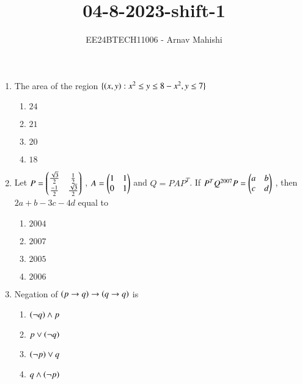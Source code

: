 \documentclass[journal]{IEEEtran}
\begin{document}

\vspace{3cm}

\title{04-8-2023-shift-1}
\author{EE24BTECH11006 - Arnav Mahishi}
{\let\newpage\relax\maketitle}
\begin{enumerate}
\item{
The area of the region $\{\left(x,y\right):x^2\leq y \leq 8-x^2,y \leq 7\}$
\begin{multicols}{4}
\begin{enumerate}
\item$24$
\item$21$
\item$20$
\item$18$
\end{enumerate}
\end{multicols}
}
\item{
Let $P=\begin{pmatrix}\frac{\sqrt{3}}{2}&\frac{1}{2}\\\frac{-1}{2}&\frac{\sqrt{3}}{2}\end{pmatrix}$ , $A=\begin{pmatrix}1&1\\0&1\end{pmatrix}$ and $Q=PAP^T$. If $P^TQ^{2007}P=\begin{pmatrix}a&b\\c&d\end{pmatrix}$ , then $2a+b-3c-4d$ equal to
\begin{multicols}{4}
\begin{enumerate}
\item $2004$
\item $2007$
\item $2005$
\item $2006$
\end{enumerate}
\end{multicols}}
\item{
Negation of $\left(p\rightarrow q\right)\rightarrow\left(q\rightarrow q\right)$ is 
\begin{multicols}{4}
\begin{enumerate}
\item $\left(\neg q\right)\wedge p$
\item $p\vee\left(\neg q\right)$
\item $\left(\neg p\right)\vee q$
\item $q\wedge\left(\neg p\right)$
\end{enumerate}
\end{multicols}
}
\end{enumerate}
\end{document}
